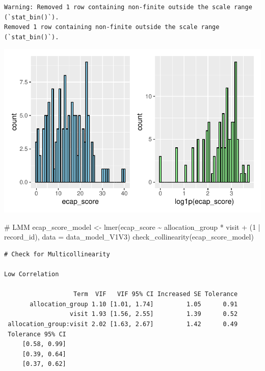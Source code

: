 \documentclass[
  letterpaper,
  DIV=11,
  numbers=noendperiod]{scrartcl}
\newenvironment{Shaded}{\begin{snugshade}}{\end{snugshade}}
\newcommand{\AttributeTok}[1]{\textcolor[rgb]{0.40,0.45,0.13}{#1}}
\newcommand{\CommentTok}[1]{\textcolor[rgb]{0.37,0.37,0.37}{#1}}
\newcommand{\DecValTok}[1]{\textcolor[rgb]{0.68,0.00,0.00}{#1}}
\newcommand{\FunctionTok}[1]{\textcolor[rgb]{0.28,0.35,0.67}{#1}}
\newcommand{\NormalTok}[1]{\textcolor[rgb]{0.00,0.23,0.31}{#1}}
\newcommand{\OtherTok}[1]{\textcolor[rgb]{0.00,0.23,0.31}{#1}}
\newcommand{\SpecialCharTok}[1]{\textcolor[rgb]{0.37,0.37,0.37}{#1}}
\begin{document}
\begin{verbatim}
Warning: Removed 1 row containing non-finite outside the scale range (`stat_bin()`).
Removed 1 row containing non-finite outside the scale range (`stat_bin()`).
\end{verbatim}

\includegraphics{Outcomes_V1V2V3_files/figure-pdf/ecap_score_1-1.pdf}

\begin{Shaded}
\begin{Highlighting}[]
\CommentTok{\# LMM}
\NormalTok{ecap\_score\_model }\OtherTok{\textless{}{-}} \FunctionTok{lmer}\NormalTok{(ecap\_score }\SpecialCharTok{\textasciitilde{}}\NormalTok{ allocation\_group }\SpecialCharTok{*}\NormalTok{ visit }\SpecialCharTok{+}\NormalTok{ (}\DecValTok{1} \SpecialCharTok{|}\NormalTok{ record\_id), }\AttributeTok{data =}\NormalTok{ data\_model\_V1V3)}
\FunctionTok{check\_collinearity}\NormalTok{(ecap\_score\_model)}
\end{Highlighting}
\end{Shaded}

\begin{verbatim}
# Check for Multicollinearity

Low Correlation

                   Term  VIF   VIF 95% CI Increased SE Tolerance
       allocation_group 1.10 [1.01, 1.74]         1.05      0.91
                  visit 1.93 [1.56, 2.55]         1.39      0.52
 allocation_group:visit 2.02 [1.63, 2.67]         1.42      0.49
 Tolerance 95% CI
     [0.58, 0.99]
     [0.39, 0.64]
     [0.37, 0.62]
\end{verbatim}
\end{document}
